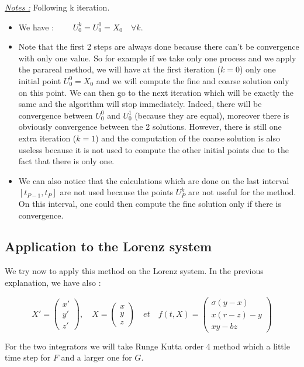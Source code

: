 \noindent \underline{\textit{Notes :}} Following k iteration.
\begin{itemize}
	\item We have : $\qquad U_0^k=U_0^0=X_0 \quad \forall k$.
	\item Note that the first 2 steps are always done because there can't be convergence with only one value. So for example if we take only one process and we apply the parareal method, we will have at the first iteration ($k=0$) only one initial point $U_0^0=X_0$ and we will compute the fine and coarse solution only on this point. We can then go to the next iteration which will be exactly the same and the algorithm will stop immediately. Indeed, there will be convergence between $U_0^0$ and $U_0^1$ (because they are equal), moreover there is obviously convergence between the 2 solutions. However, there is still one extra iteration ($k=1$) and the computation of the coarse solution is also useless because it is not used to compute the other initial points due to the fact that there is only one.
	\item We can also notice that the calculations which are done on the last interval $[t_{P-1},t_P]$ are not used because the points $U_P^k$ are not useful for the method. On this interval, one could then compute the fine solution only if there is convergence.
\end{itemize}

\subsection{Application to the Lorenz system}

We try now to apply this method on the Lorenz system. In the previous explanation, we have also :

$$X'=\begin{pmatrix}
    x' \\
    y' \\
    z'
\end{pmatrix}, \quad X=\begin{pmatrix}
    x \\
    y \\
    z
\end{pmatrix} \quad et \quad f(t,X)=\begin{pmatrix}
    \sigma(y-x) \\
    x(r-z)-y \\
    xy-bz
\end{pmatrix}$$

\noindent For the two integrators we will take Runge Kutta order 4 method which a little time step for $F$ and a larger one for $G$.
